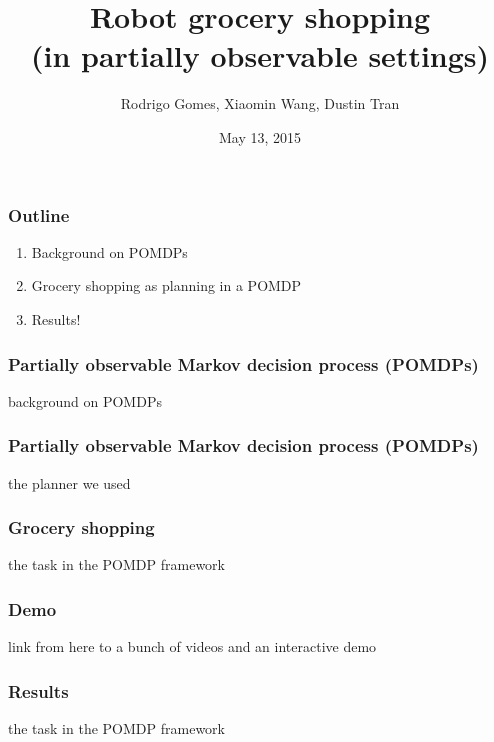 \documentclass[10pt, compress]{beamer}
\title{Robot grocery shopping\\(in partially observable settings)}
\subtitle{}
\date{May 13, 2015}
\author{Rodrigo Gomes, Xiaomin Wang, Dustin Tran}
\institute{MIT, 6.834j Cognitive Robotics}
\begin{document}
\maketitle

\begin{frame}[fragile]
  \frametitle{Outline}

  \begin{enumerate}
  \item Background on POMDPs
  \item Grocery shopping as planning in a POMDP
  \item Results!
  \end{enumerate}
\end{frame}

\begin{frame}[fragile]
  \frametitle{Partially observable Markov decision process (POMDPs)}

  background on POMDPs
\end{frame}

\begin{frame}[fragile]
  \frametitle{Partially observable Markov decision process (POMDPs)}

  the planner we used
\end{frame}

\begin{frame}[fragile]
  \frametitle{Grocery shopping}

  the task in the POMDP framework
\end{frame}

\begin{frame}[fragile]
  \frametitle{Demo}

  link from here to a bunch of videos and an interactive demo
\end{frame}

\begin{frame}[fragile]
  \frametitle{Results}

  the task in the POMDP framework
\end{frame}

\end{document}
